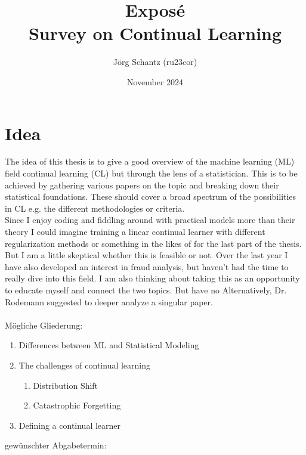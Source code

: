 \documentclass[12pt,a4paper]{article}
\title{Exposé\\
	\Large{Survey on Continual Learning}}
\author{Jörg Schantz (ru23cor)}
\date{November 2024}
\begin{document}
	\maketitle
	\renewcommand{\labelenumii}{\arabic{enumi}.\arabic{enumii}}
	\renewcommand{\labelenumiii}{\arabic{enumi}.\arabic{enumii}.\arabic{enumiii}}
	\renewcommand{\labelenumiv}{\arabic{enumi}.\arabic{enumii}.arabic{enumiii}.\arabic{enumiv}}
\section*{Idea}
	The idea of this thesis is to give a good overview of the machine learning (ML) field continual learning (CL) but through the lens of a statistician. This is to be achieved by gathering various papers on the topic and breaking down their statistical foundations. These should cover a broad spectrum of the possibilities in CL e.g. the different methodologies or criteria.\\
	Since I enjoy coding and fiddling around with practical models more than their theory I could imagine training a linear continual learner with different regularization methods or something in the likes of for the last part of the thesis. But I am a little skeptical whether this is feasible or not. Over the last year I have also developed an interest in fraud analysis, but haven't had the time to really dive into this field. I am also thinking about taking this as an opportunity to educate myself and connect the two topics. But have no  Alternatively, Dr. Rodemann suggested to deeper analyze a singular paper.\\
	
	\\Mögliche Gliederung:
	\begin{enumerate}
		\item Differences between ML and Statistical Modeling
		\item The challenges of continual learning 
		\begin{enumerate}
			\item Distribution Shift
			\item Catastrophic Forgetting
		\end{enumerate}
		\item Defining a continual learner
	\end{enumerate}
	gewünschter Abgabetermin:\\
\end{document}
